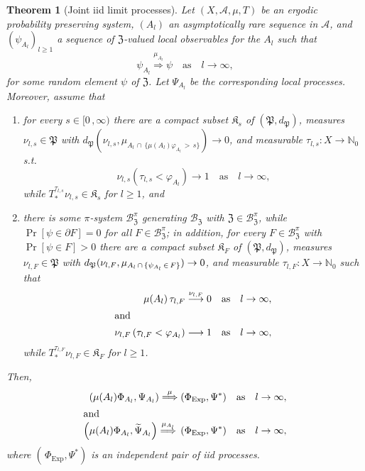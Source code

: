 \documentclass[10pt]{amsart}
\newtheorem{theo}{Theorem}[section]
\theoremstyle{definition}\newtheorem{defi}[theo]{Definition}\newtheorem{rema}[theo]{Remark}\newtheorem{exam}[theo]{Example}\newtheorem{exem}[theo]{Example}\newtheorem{nota}[theo]{Notation}
\newcommand{\clA}{\mathcal{A}}
\newcommand{\clB}{\mathcal{B}}
\newcommand{\Expl}{\mathrm{Exp}}
\newcommand{\frkK}{\mathfrak{K}}
\newcommand{\frkP}{\mathfrak{P}}
\newcommand{\frkZ}{\mathfrak{Z}}
\newcommand{\bbN}{\mathbb{N}}
\newcommand*{\Alphenumi}{\renewcommand*{\theenumi}{\Alph{enumi}}}
\begin{document}
\begin{theo}[{Joint iid limit processes}]\label{T_SpatiotemporalIIDLimits}
Let $(X,\clA,\mu,T)$ be an ergodic probability preserving system, $(A_{l})$ an asymptotically rare sequence in $\clA$, and $(\psi_{A_{l}})_{l\geq 1}$ a sequence of $\frkZ$-valued local observables for the $A_{l}$ such that
\begin{equation}
\psi_{A_{l}}\overset{\mu_{A_{l}}}{\Longrightarrow}\psi\quad\text{as}\quad l\rightarrow\infty,
\end{equation}
for some random element $\psi$ of $\frkZ$. Let $\Psi_{A_{l}}$ be the corresponding local processes. Moreover, assume that
\begin{enumerate}\Alphenumi
\item\label{theo 5.3.A} for every $s\in\lbrack0\,,\infty)$ there are a compact subset $\frkK_{s}$ of $(\frkP,d_{\frkP})$, measures $\nu _{l,s}\in\frkP$ with $d_{\frkP}(\nu_{l,s},\mu_{A_{l}\,\cap
\,\{\mu(A_{l})\varphi_{A_{l}}\,>\,s\}})\rightarrow0$, and measurable $\tau _{l,s}:X\rightarrow\bbN_{0}$ s.t.
\begin{equation}\label{Eq_xdrxrxxdxrxdrxd}
\nu_{l,s}\left(\tau_{l,s}<\varphi_{A_{l}}\right) \longrightarrow 1\quad\text{as}\quad l\rightarrow\infty, 
\end{equation}
while $T_{\ast}^{\tau_{l,s}}\nu_{l,s}\in\frkK_{s}$ for $l\geq1$, and

\item\label{theo 5.3.B} there is some $\pi$-system $\clB_{\frkZ}^{\pi}$ generating $\clB_{\frkZ}$ with $\frkZ\in\clB _{\frkZ}^{\pi}$, while $\Pr[\psi\in\partial F]=0$ for all $F\in\clB_{\frkZ}^{\pi}$; in addition, for every $F\in
\clB_{\frkZ}^{\pi}$ with $\Pr[\psi\in F]>0$ there are a compact subset $\frkK_{F}$ of $(\frkP,d_{\frkP})$, measures $\nu_{l,F}\in\frkP$ with $d_{\frkP}(\nu_{l,F},\mu_{A_{l}
\,\cap\,\{\psi_{A_{l}}\,\in\,F\}})\linebreak\rightarrow0$, and measurable $\tau_{l,F} :X\rightarrow\bbN_{0}$ such that
\begin{align}
\mu(A_{l})\,\tau_{l,F}\overset{\nu_{l,F}}{\longrightarrow}0\quad &\text{as}\quad l\rightarrow\infty, \label{Eq_vzgvzgvzgvzgvzgv1}
\\
\intertext{and}
\nu_{l,F}\left(\tau_{l,F}<\varphi_{A_{l}}\right) \longrightarrow 1\quad &\text{as}\quad l\rightarrow\infty, \label{Eq_owowowowowoowwowowow}
\end{align}
while $T_{\ast}^{\tau_{l,F}}\nu_{l,F}\in\frkK_{F}$ for $l\geq 1$.
\end{enumerate}

Then,
\begin{align}
\left(\mu(A_{l})\Phi_{A_{l}},\Psi_{A_{l}}\right)\overset{\mu}{\Longrightarrow} \left(\Phi_{\Expl},\Psi^{\ast}\right)\quad &\text{as}\quad l\rightarrow\infty,
\\
\intertext{and}
\left(\mu(A_{l})\Phi_{A_{l}},\widetilde{\Psi}_{A_{l}}\right)\overset{\mu_{A_{l}}}{\Longrightarrow}\,\left(\Phi_{\Expl},\Psi^{\ast}\right)\quad &\text{as}\quad l\rightarrow\infty,\label{Eq_qdqdqdqdqd}
\end{align}
where $(\,\Phi_{\Expl},\Psi^{\ast})$ is an independent pair of iid processes.
\end{theo}
\end{document}
